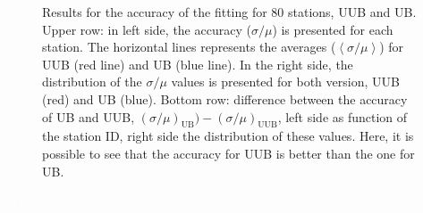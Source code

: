 \documentclass[twoside, final, 10pt]{articleMine}
\begin{document}
\begin{figure}[!t]
  \centering
  \caption{Results for the accuracy of the \qpkvem fitting for
  $80$ stations, UUB and UB. Upper row: in left side, the
  accuracy ($\sigma/\mu$) is presented for each station. The
  horizontal lines represents the averages ($\left< \sigma/\mu
  \right>$) for UUB (red line) and UB (blue line). In the right
  side, the distribution of the $\sigma/\mu$ values is presented
  for both version, UUB (red) and UB (blue). Bottom row:
  difference between the accuracy of UB and UUB,
  $\left(\sigma/\mu\right)_{\mathrm{UB}})-\left(\sigma/\mu\right)_{\mathrm{UUB}}$,
  left side as function of the station ID, right side the
  distribution of these values. Here, it is possible to see that
  the accuracy for UUB is better than the one for UB.}
  \label{figAccuracyResults}
\end{figure}
\textcolor{white}{hi}
\clearpage
\end{document}
